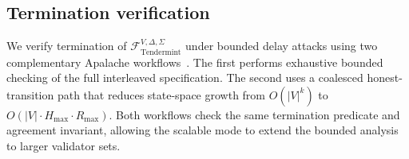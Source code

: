 \documentclass[conference,letterpaper,10pt]{IEEEtran}
\begin{document}
\subsection{Termination verification}

We verify termination of $\mathcal{F}^{V,\Delta,\Sigma}_{\mathrm{Tendermint}}$ under bounded delay attacks using two complementary Apalache workflows~\cite{konnov2019tla+}. The first performs exhaustive bounded checking of the full interleaved specification. The second uses a coalesced honest-transition path that reduces state-space growth from $O(|V|^k)$ to $O(|V|\cdot H_{\max}\cdot R_{\max})$. Both workflows check the same termination predicate and agreement invariant, allowing the scalable mode to extend the bounded analysis to larger validator sets.

\begin{table}[!t]
\centering
\caption{
Verification results for $\mathcal{F}^{V,\Delta,\Sigma}_{\mathrm{Tendermint}}$ under bounded delay attacks.
The exhaustive mode ($|V|=4$, $f=1$, $H_{\max}=1$) explores parameter sensitivity across
$\Sigma\times\Delta\times R_{\max}$ with aggressive values ($\Sigma\in\{3,4,5\}$, $\Delta\in\{3,4\}$).
The scalable mode evaluates larger validator sets with $|V|\in\{7,10,13\}$ and $H_{\max}\in\{3,5\}$.
All checks evaluate the \texttt{Agreement} and \texttt{NotYetTerminated} invariants.
}
\label{tab:comprehensive}
\end{table}
\end{document}
